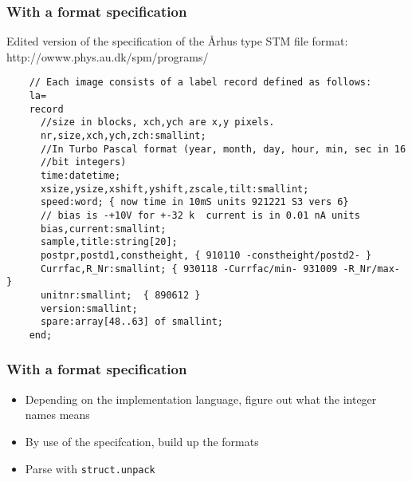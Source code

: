 \documentclass{beamer}
\begin{document}
\begin{frame}[fragile]
  \frametitle{With a format specification}
  Edited version of the specification of the \AA{}rhus type STM file format: http://owww.phys.au.dk/spm/programs/
  \footnotesize
  \begin{verbatim}
    // Each image consists of a label record defined as follows:
    la=
    record
      //size in blocks, xch,ych are x,y pixels.
      nr,size,xch,ych,zch:smallint;
      //In Turbo Pascal format (year, month, day, hour, min, sec in 16
      //bit integers)
      time:datetime;
      xsize,ysize,xshift,yshift,zscale,tilt:smallint;
      speed:word; { now time in 10mS units 921221 S3 vers 6}
      // bias is -+10V for +-32 k  current is in 0.01 nA units
      bias,current:smallint;
      sample,title:string[20];
      postpr,postd1,constheight, { 910110 -constheight/postd2- }
      Currfac,R_Nr:smallint; { 930118 -Currfac/min- 931009 -R_Nr/max- }
      unitnr:smallint;  { 890612 }
      version:smallint;
      spare:array[48..63] of smallint;
    end;
  \end{verbatim}
\end{frame}

\begin{frame}[fragile]
  \frametitle{With a format specification}
  \begin{itemize}
  \item Depending on the implementation language, figure out what the integer names means
  \item By use of the specifcation, build up the formats
  \item Parse with \texttt{struct.unpack}
  \end{itemize}
\end{frame}
\end{document}
